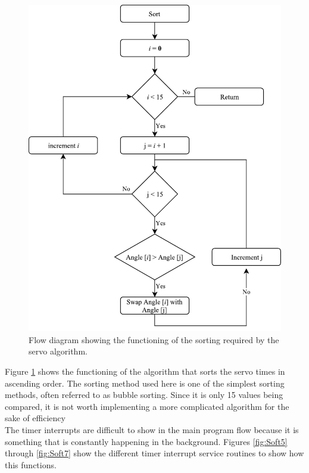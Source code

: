 \begin{figure}[H]
\centering
\includegraphics[scale = 1]{pics/Soft4.pdf}
\caption{Flow diagram showing the functioning of the sorting required by the servo algorithm.}
\label{fig:Soft4}
\end{figure}

Figure \ref{fig:Soft4} shows the functioning of the algorithm that sorts the servo times in ascending order. The sorting method used here is one of the simplest sorting methods, often referred to as bubble sorting. Since it is only 15 values being compared, it is not worth implementing a more complicated algorithm for the sake of efficiency\\

The timer interrupts are difficult to show in the main program flow because it is something that is constantly happening in the background. Figures \ref{fig:Soft5} through \ref{fig:Soft7} show the different timer interrupt service routines to show how this functions.\\

